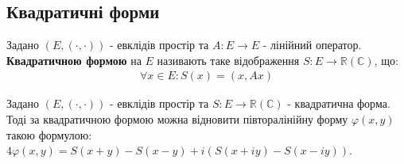 \iffalse
\subsection{Квадратичні форми}
\begin{definition}
Задано $(E,(\cdot,\cdot))$ - евклідів простір та $A: E \to E$ - лінійний оператор.\\
\textbf{Квадратичною формою} на $E$ називають таке відображення $S: E \to \mathbb{R} (\mathbb{C})$, що:
\begin{align*}
\forall x \in E: S(x) = (x,Ax)
\end{align*}
\end{definition}

\begin{proposition}
Задано $(E,(\cdot,\cdot))$ - евклідів простір та $S: E \to \mathbb{R}(\mathbb{C})$ - квадратична форма. Тоді за квадратичною формою можна відновити півторалінійну форму $\varphi(x,y)$ такою формулою:\\
$4 \varphi(x,y) = S(x+y) - S(x-y) + i(S(x+iy)-S(x-iy))$.

\end{proposition}

